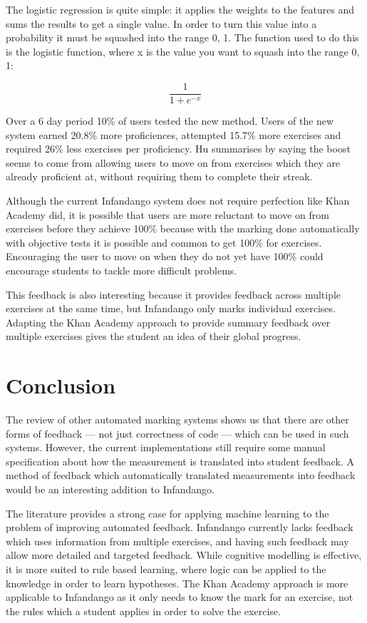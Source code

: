 The logistic regression is quite simple: it applies the weights to the features and sums the results to get a single value. In order to turn this value into a probability it must be squashed into the range 0, 1. The function used to do this is the logistic function, where x is the value you want to squash into the range 0, 1:

\begin{displaymath}
\frac{1}{1+e^{-x}}
\end{displaymath}

Over a 6 day period 10\% of users tested the new method. Users of the new system earned 20.8\% more proficiences, attempted 15.7\% more exercises and required 26\% less exercises per proficiency. Hu summarises by saying the boost seems to come from allowing users to move on from exercises which they are already proficient at, without requiring them to complete their streak.

Although the current Infandango system does not require perfection like Khan Academy did, it is possible that users are more reluctant to move on from exercises before they achieve 100\% because with the marking done automatically with objective tests it is possible and common to get 100\% for exercises. Encouraging the user to move on when they do not yet have 100\% could encourage students to tackle more difficult problems.

This feedback is also interesting because it provides feedback across multiple exercises at the same time, but Infandango only marks individual exercises. Adapting the Khan Academy approach to provide summary feedback over multiple exercises gives the student an idea of their global progress.


\section{Conclusion}
The review of other automated marking systems shows us that there are other forms of feedback --- not just correctness of code --- which can be used in such systems. However, the current implementations still require some manual specification about how the measurement is translated into student feedback. A method of feedback which automatically translated measurements into feedback would be an interesting addition to Infandango.

The literature provides a strong case for applying machine learning to the problem of improving automated feedback. Infandango currently lacks feedback which uses information from multiple exercises, and having such feedback may allow more detailed and targeted feedback. While cognitive modelling is effective, it is more suited to rule based learning, where logic can be applied to the knowledge in order to learn hypotheses. The Khan Academy approach is more applicable to Infandango as it only needs to know the mark for an exercise, not the rules which a student applies in order to solve the exercise.
